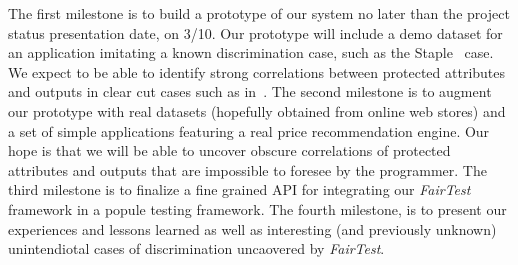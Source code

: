 \documentclass{article}
\newcommand{\thetool}{{\it FairTest}\xspace}
\newcommand{\heading}[1]{\noindent{\bf{#1}}}
\begin{document}
\heading{Research Plan.}
The first milestone is to build a prototype of our system no later than
the project status presentation date, on 3/10. Our prototype will include a
demo dataset for an application imitating a known discrimination case, such as
the Staple~\cite{Staples} case. We expect to be able to identify strong
correlations between protected attributes and outputs in clear cut cases such
as in~\cite{Staples}. The second milestone is to augment our prototype
with real datasets (hopefully obtained from online web stores) and a set of
simple applications featuring a real price recommendation engine. Our hope is
that we will be able to uncover obscure correlations of protected attributes
and outputs that are impossible to foresee by the programmer. The third
milestone is to finalize a fine grained API for integrating our \thetool
framework in a popule testing framework. The fourth milestone, is to present
our experiences and lessons learned as well as interesting (and previously
unknown) unintendiotal cases of discrimination uncaovered by \thetool.

\clearpage
{
  \scriptsize
  \setlength\itemsep{0pt}
  \footnotesize
  
  
}
\end{document}
